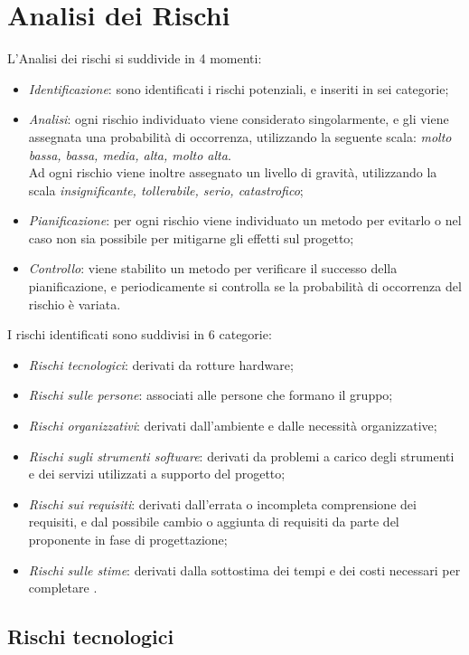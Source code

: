 \section{Analisi dei Rischi}
L'Analisi dei rischi si suddivide in 4 momenti:
\begin{itemize}
\item \textit{Identificazione}: sono identificati i rischi potenziali, e inseriti in sei categorie;
\item \textit{Analisi}: ogni rischio individuato viene considerato singolarmente, e gli viene assegnata una probabilità di occorrenza, utilizzando la seguente scala: \textit{molto bassa, bassa, media, alta, molto alta}. \\
Ad ogni rischio viene inoltre assegnato un livello di gravità, utilizzando la scala \textit{insignificante, tollerabile, serio, catastrofico};
\item \textit{Pianificazione}: per ogni rischio viene individuato un metodo per evitarlo o nel caso non sia possibile per mitigarne gli effetti sul progetto;
\item \textit{Controllo}: viene stabilito un metodo per verificare il successo della pianificazione, e periodicamente si controlla se la probabilità di occorrenza del rischio è variata.
\end{itemize}

I rischi identificati sono suddivisi in 6 categorie:
\begin{itemize}
\item \textit{Rischi tecnologici}: derivati da rotture hardware;
\item \textit{Rischi sulle persone}: associati alle persone che formano il gruppo;
\item \textit{Rischi organizzativi}: derivati dall'ambiente e dalle necessità organizzative;
\item \textit{Rischi sugli strumenti software}: derivati da problemi a carico degli strumenti e dei servizi utilizzati a supporto del progetto;
\item \textit{Rischi sui requisiti}: derivati dall'errata o incompleta comprensione dei requisiti, e dal possibile cambio o aggiunta di requisiti da parte del proponente in fase di progettazione;
\item \textit{Rischi sulle stime}: derivati dalla sottostima dei tempi e dei costi necessari per completare \ProjectName{}.
\end{itemize}

	\subsection{Rischi tecnologici}
	
